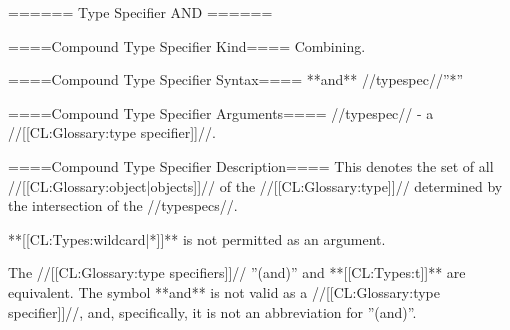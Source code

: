 ====== Type Specifier AND ======

====Compound Type Specifier Kind====
Combining.

====Compound Type Specifier Syntax====
**and** //typespec//''*''

====Compound Type Specifier Arguments====
//typespec// - a //[[CL:Glossary:type specifier]]//.

====Compound Type Specifier Description====
This denotes the set of all //[[CL:Glossary:object|objects]]// of the //[[CL:Glossary:type]]// determined by the intersection of the //typespecs//.

**[[CL:Types:wildcard|*]]** is not permitted as an argument.

The //[[CL:Glossary:type specifiers]]// ''(and)'' and **[[CL:Types:t]]** are equivalent. The symbol **and** is not valid as a //[[CL:Glossary:type specifier]]//, and, specifically, it is not an abbreviation for ''(and)''.

